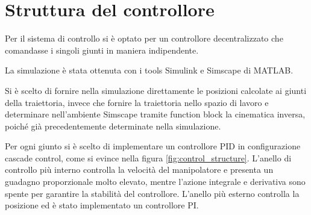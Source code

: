 \chapter{Struttura del controllore}
\graphicspath{{media/1_intro}}
Per il sistema di controllo si è optato per un controllore decentralizzato che comandasse i singoli giunti in maniera indipendente.

La simulazione è stata ottenuta con i tools Simulink e Simscape di MATLAB.

Si è scelto di fornire nella simulazione direttamente le posizioni calcolate ai giunti della traiettoria, invece che fornire la traiettoria nello spazio di lavoro e determinare nell'ambiente Simscape tramite function block la cinematica inversa, poiché già precedentemente determinate nella simulazione.

Per ogni giunto si è scelto di implementare un controllore PID in configurazione cascade control, come si evince nella figura \ref{fig:control_structure}. L'anello di controllo più interno controlla la velocità del manipolatore e presenta un guadagno proporzionale molto elevato, mentre l'azione integrale e derivativa sono spente per garantire la stabilità del controllore. L'anello più esterno controlla la posizione ed è stato implementato un controllore PI. 

